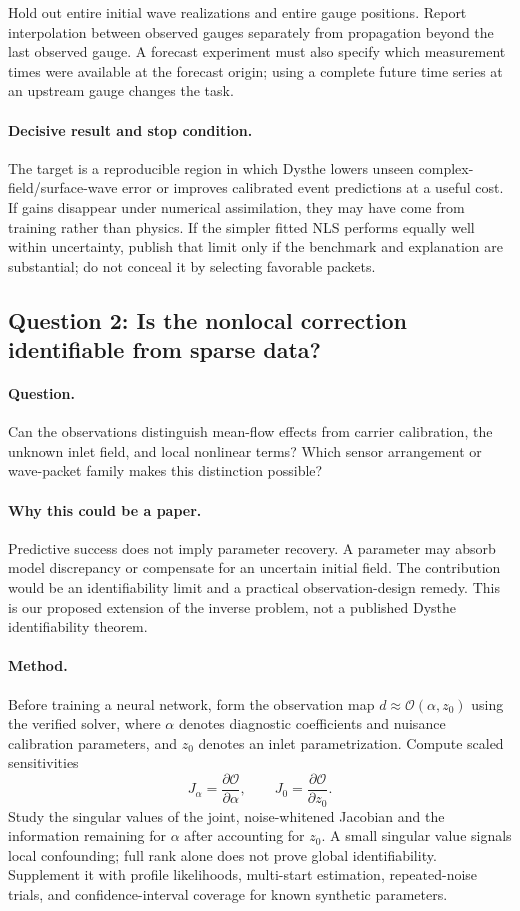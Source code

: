 Hold out entire initial wave realizations and entire gauge positions.
Report interpolation between observed gauges separately from propagation
beyond the last observed gauge. A forecast experiment must also specify
which measurement times were available at the forecast origin; using a
complete future time series at an upstream gauge changes the task.

\paragraph{Decisive result and stop condition.}
The target is a reproducible region in which Dysthe lowers unseen
complex-field/surface-wave error or improves calibrated event predictions
at a useful cost. If gains disappear under numerical assimilation, they
may have come from training rather than physics. If the simpler fitted
NLS performs equally well within uncertainty, publish that limit only if
the benchmark and explanation are substantial; do not conceal it by
selecting favorable packets.

\subsection{Question 2: Is the nonlocal correction identifiable from sparse data?}
\paragraph{Question.}
Can the observations distinguish mean-flow effects from carrier calibration,
the unknown inlet field, and local nonlinear terms? Which sensor arrangement
or wave-packet family makes this distinction possible?

\paragraph{Why this could be a paper.}
Predictive success does not imply parameter recovery. A parameter may
absorb model discrepancy or compensate for an uncertain initial field.
The contribution would be an identifiability limit and a practical
observation-design remedy. This is our proposed extension of the inverse
problem, not a published Dysthe identifiability theorem.

\paragraph{Method.}
Before training a neural network, form the observation map
$d\approx\mathcal O(\alpha,z_0)$ using the verified solver, where
$\alpha$ denotes diagnostic coefficients and nuisance calibration
parameters, and $z_0$ denotes an inlet parametrization. Compute scaled
sensitivities
\[
 J_\alpha=\frac{\partial\mathcal O}{\partial\alpha},
 \qquad J_0=\frac{\partial\mathcal O}{\partial z_0}.
\]
Study the singular values of the joint, noise-whitened Jacobian and the
information remaining for $\alpha$ after accounting for $z_0$. A small
singular value signals local confounding; full rank alone does not prove
global identifiability. Supplement it with profile likelihoods,
multi-start estimation, repeated-noise trials, and confidence-interval
coverage for known synthetic parameters.

